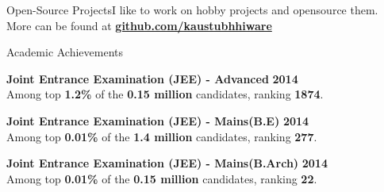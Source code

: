 \documentclass{resume} %
\begin{document}
\begin{rSection}{\large Open-Source Projects}{}{I like to work on hobby projects and opensource them. More can be found at \textbf{\href{https://github.com/kaustubhhiware}{github.com/kaustubhhiware}}}


\end{rSection}



\begin{rSection}{Academic Achievements}

{\bf \large Joint Entrance Examination (JEE) - Advanced} \hfill \textbf{2014} \\ 
Among top \textbf{1.2\%} of the \textbf{0.15 million} candidates, ranking \textbf{1874}.

{\bf \large Joint Entrance Examination (JEE) - Mains(B.E)} \hfill \textbf{2014} \\ 
Among top \textbf{0.01\%} of the \textbf{1.4 million} candidates, ranking \textbf{277}.

{\bf \large Joint Entrance Examination (JEE) - Mains(B.Arch)} \hfill \textbf{2014} \\ 
Among top \textbf{0.01\%} of the \textbf{0.15 million} candidates, ranking \textbf{22}.

\end{rSection}

\end{document}
